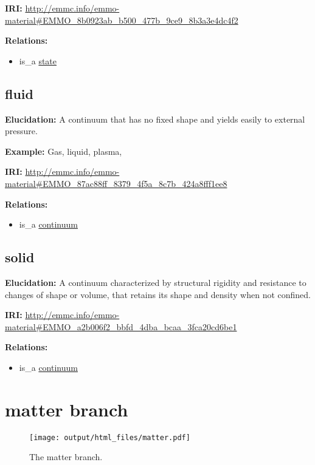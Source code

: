 \documentclass[a4paper,]{report}
\providecommand{\tightlist}{%
  \setlength{\itemsep}{0pt}\setlength{\parskip}{0pt}}
\begin{document}
\textbf{IRI:}
\url{http://emmc.info/emmo-material\#EMMO_8b0923ab_b500_477b_9ce9_8b3a3e4dc4f2}

\textbf{Relations:}

\begin{itemize}
\tightlist
\item
  is\_a \protect\hyperlink{state}{state}
\end{itemize}

\hypertarget{fluid}{%
\subsection{fluid}\label{fluid}}

\textbf{Elucidation:} A continuum that has no fixed shape and yields
easily to external pressure.

\textbf{Example:} Gas, liquid, plasma,

\textbf{IRI:}
\url{http://emmc.info/emmo-material\#EMMO_87ac88ff_8379_4f5a_8c7b_424a8fff1ee8}

\textbf{Relations:}

\begin{itemize}
\tightlist
\item
  is\_a \protect\hyperlink{continuum}{continuum}
\end{itemize}

\hypertarget{solid}{%
\subsection{solid}\label{solid}}

\textbf{Elucidation:} A continuum characterized by structural rigidity
and resistance to changes of shape or volume, that retains its shape and
density when not confined.

\textbf{IRI:}
\url{http://emmc.info/emmo-material\#EMMO_a2b006f2_bbfd_4dba_bcaa_3fca20cd6be1}

\textbf{Relations:}

\begin{itemize}
\tightlist
\item
  is\_a \protect\hyperlink{continuum}{continuum}
\end{itemize}

\hypertarget{matter-branch}{%
\section{matter branch}\label{matter-branch}}

\begin{figure}
\centering
\texttt{[image: output/html\_files/matter.pdf]}
\caption{The matter branch.}
\end{figure}
\end{document}
